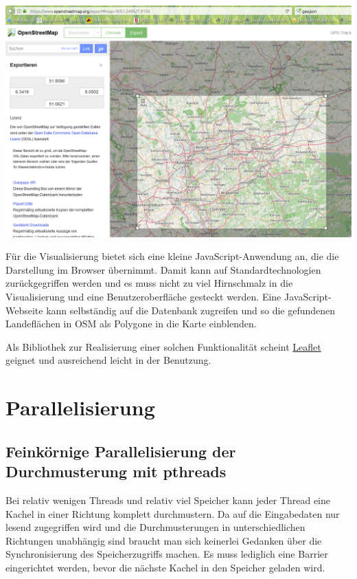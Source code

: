 \documentclass[
11pt, %
a4paper, %
oneside, %
pdfspacing, %
headinclude,
BCOR5mm, %
ngerman, %
bibtotocnumbered,
]{scrartcl}
\begin{document}
\includegraphics[width=\textwidth]{./drawings/AuswahlKartenausschnitt.png}

Für die Visualisierung bietet sich eine kleine JavaScript-Anwendung an, die die Darstellung im Browser übernimmt. Damit kann auf Standardtechnologien zurückgegriffen werden und es muss nicht zu viel Hirnschmalz in die Visualisierung und eine Benutzeroberfläche gesteckt werden. 
Eine JavaScript-Webseite kann selbständig auf die Datenbank zugreifen und so die gefundenen Landeflächen in OSM als Polygone in die Karte einblenden. 

Als Bibliothek zur Realisierung einer solchen Funktionalität scheint \href{http://leafletjs.com/examples.html }{Leaflet} geignet und ausreichend leicht in der Benutzung.





\section{Parallelisierung}

\subsection{Feinkörnige Parallelisierung der Durchmusterung mit pthreads}

Bei relativ wenigen Threads und relativ viel Speicher kann jeder Thread eine Kachel in einer Richtung komplett durchmustern. Da auf die Eingabedaten nur lesend zugegriffen wird und die Durchmusterungen in unterschiedlichen Richtungen unabhängig sind braucht man sich keinerlei Gedanken über die Synchronisierung des Speicherzugriffs machen. Es muss lediglich eine Barrier eingerichtet werden, bevor die nächste Kachel in den Speicher geladen wird.
\end{document}
